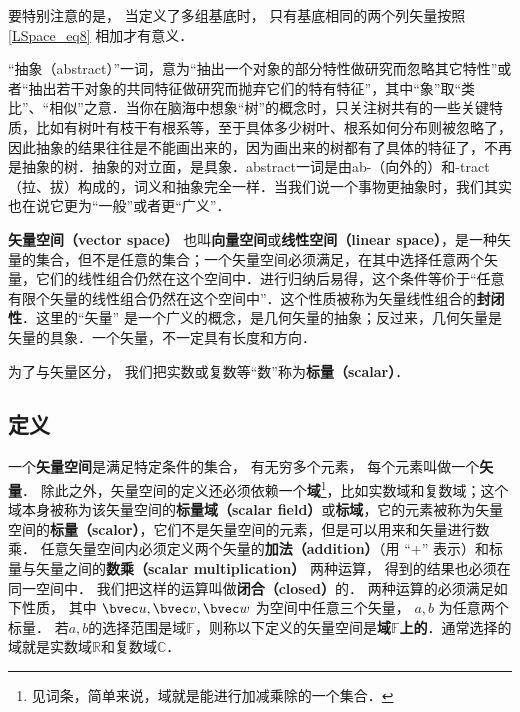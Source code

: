 要特别注意的是， 当定义了多组基底时， 只有基底相同的两个列矢量按照\autoref{LSpace_eq8} 相加才有意义．









“抽象（abstract）”一词，意为“抽出一个对象的部分特性做研究而忽略其它特性”或者“抽出若干对象的共同特征做研究而抛弃它们的特有特征”，其中“象”取“类比”、“相似”之意．当你在脑海中想象“树”的概念时，只关注树共有的一些关键特质，比如有树叶有枝干有根系等，至于具体多少树叶、根系如何分布则被忽略了，因此抽象的结果往往是不能画出来的，因为画出来的树都有了具体的特征了，不再是抽象的树．抽象的对立面，是具象．abstract一词是由ab-（向外的）和-tract（拉、拔）构成的，词义和抽象完全一样．当我们说一个事物更抽象时，我们其实也在说它更为“一般”或者更“广义”．

\textbf{矢量空间（vector space）} 也叫\textbf{向量空间}或\textbf{线性空间（linear space）}，是一种矢量的集合，但不是任意的集合；一个矢量空间必须满足，在其中选择任意两个矢量，它们的线性组合仍然在这个空间中．进行归纳后易得，这个条件等价于“任意有限个矢量的线性组合仍然在这个空间中”．这个性质被称为矢量线性组合的\textbf{封闭性}．这里的“矢量” 是一个广义的概念，是几何矢量的抽象；反过来，几何矢量是矢量的具象．一个矢量，不一定具有长度和方向．



为了与矢量区分， 我们把实数或复数等“数”称为\textbf{标量（scalar）}．

\subsection{定义}
一个\textbf{矢量空间}是满足特定条件的集合， 有无穷多个元素， 每个元素叫做一个\textbf{矢量}． 除此之外，矢量空间的定义还必须依赖一个\textbf{域}\footnote{见词条，简单来说，域就是能进行加减乘除的一个集合．}，比如实数域和复数域；这个域本身被称为该矢量空间的\textbf{标量域（scalar field）}或\textbf{标域}，它的元素被称为矢量空间的\textbf{标量（scalor）}，它们不是矢量空间的元素，但是可以用来和矢量进行数乘． 任意矢量空间内必须定义两个矢量的\textbf{加法（addition）}（用 “+” 表示）和标量与矢量之间的\textbf{数乘（scalar multiplication）} 两种运算， 得到的结果也必须在同一空间中． 我们把这样的运算叫做\textbf{闭合（closed）}的． 两种运算的必须满足如下性质， 其中 $\bvec u,\bvec v,\bvec w$ 为空间中任意三个矢量， $a,b$ 为任意两个标量． 若$a,b$的选择范围是域$\mathbb{F}$，则称以下定义的矢量空间是\textbf{域}$\mathbb{F}$\textbf{上的}．通常选择的域就是实数域$\mathbb{R}$和复数域$\mathbb{C}$．

